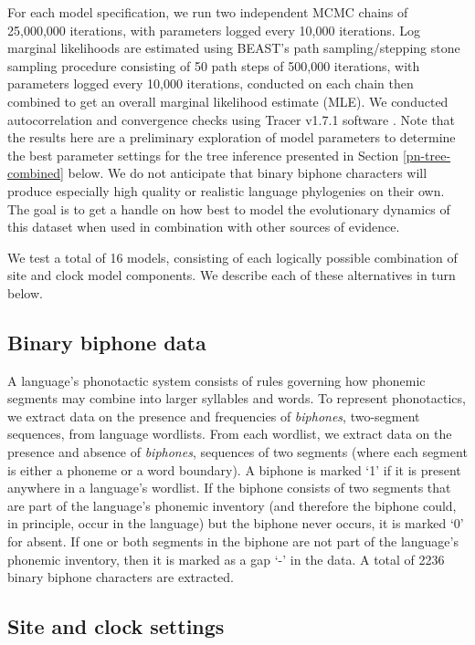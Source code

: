\documentclass[]{article}
\begin{document}
For each model specification, we run two independent MCMC chains of 25,000,000 iterations, with parameters logged every 10,000 iterations. Log marginal likelihoods are estimated using BEAST's path sampling/stepping stone sampling procedure \autocite{baele_accurate_2013} consisting of 50 path steps of 500,000 iterations, with parameters logged every 10,000 iterations, conducted on each chain then combined to get an overall marginal likelihood estimate (MLE). We conducted autocorrelation and convergence checks using Tracer v1.7.1 software \autocite{rambaut_posterior_2018}. Note that the results here are a preliminary exploration of model parameters to determine the best parameter settings for the tree inference presented in Section \ref{pn-tree-combined} below. We do not anticipate that binary biphone characters will produce especially high quality or realistic language phylogenies on their own. The goal is to get a handle on how best to model the evolutionary dynamics of this dataset when used in combination with other sources of evidence.

We test a total of 16 models, consisting of each logically possible combination of site and clock model components. We describe each of these alternatives in turn below.

\hypertarget{binary-biphone-data}{%
\subsection{Binary biphone data}\label{binary-biphone-data}}

A language's phonotactic system consists of rules governing how phonemic segments may combine into larger syllables and words. To represent phonotactics, we extract data on the presence and frequencies of \emph{biphones}, two-segment sequences, from language wordlists. From each wordlist, we extract data on the presence and absence of \emph{biphones}, sequences of two segments (where each segment is either a phoneme or a word boundary). A biphone is marked `1' if it is present anywhere in a language's wordlist. If the biphone consists of two segments that are part of the language's phonemic inventory (and therefore the biphone could, in principle, occur in the language) but the biphone never occurs, it is marked `0' for absent. If one or both segments in the biphone are not part of the language's phonemic inventory, then it is marked as a gap `-' in the data. A total of 2236 binary biphone characters are extracted.

\hypertarget{site-and-clock-settings}{%
\subsection{Site and clock settings}\label{site-and-clock-settings}}
\end{document}
